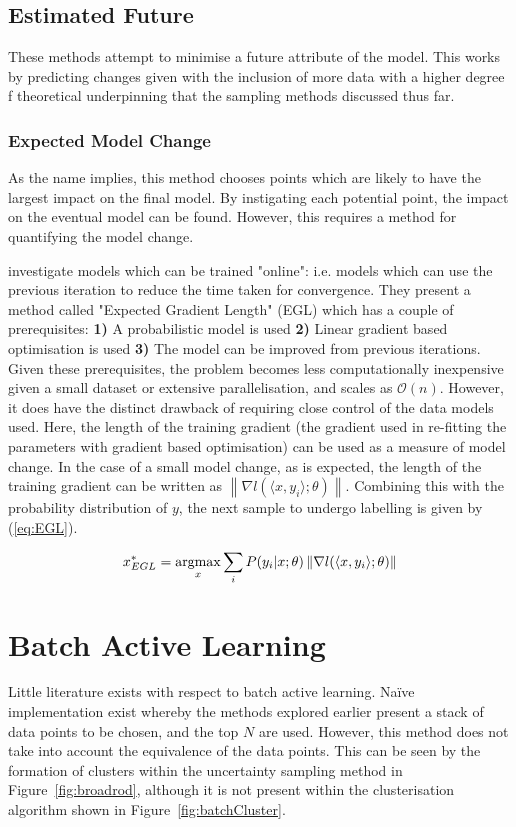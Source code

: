\subsection{Estimated Future}
These methods attempt to minimise a future attribute of the model. This works by predicting changes given with the inclusion of more data with a higher degree f theoretical underpinning that the sampling methods discussed thus far.

\subsubsection{Expected Model Change}
As the name implies, this method chooses points which are likely to have the largest impact on the final model. By instigating each potential point, the impact on the eventual model can be found. However, this requires a method for quantifying the model change.

\textcite{Set08,Set09} investigate models which can be trained "online": i.e. models which can use the previous iteration to reduce the time taken for convergence. They present a method called "Expected Gradient Length" (EGL) which has a couple of prerequisites: \textbf{1)} A probabilistic model is used \textbf{2)} Linear gradient based optimisation is used \textbf{3)} The model can be improved from previous iterations. Given these prerequisites, the problem becomes less computationally inexpensive given a small dataset or extensive parallelisation, and scales as $\mathcal{O}(n)$. However, it does have the distinct drawback of requiring close control of the data models used. Here, the length of the training gradient (the gradient used in re-fitting the parameters with gradient based optimisation) can be used as a measure of model change. In the case of a small model change, as is expected, the length of the training gradient can be written as ${\left\|\nabla{}l(\langle{}x, y_i\rangle{};\theta{})\right\|}$. Combining this with the probability distribution of $y$, the next sample to undergo labelling is given by (\ref{eq:EGL}).

\begin{equation}
    \label{eq:EGL}
    x_{EGL}^*=\operatorname*{argmax}_x{\sum_i{P(y_i|x;\theta{})\left\|\nabla{}l(\langle{}x, y_i\rangle{};\theta{})\right\|}}
\end{equation}


\section{Batch Active Learning}
Little literature exists with respect to batch active learning. Naïve implementation exist whereby the methods explored earlier present a stack of data points to be chosen, and the top $N$ are used. However, this method does not take into account the equivalence of the data points. This can be seen by the formation of clusters within the uncertainty sampling method in Figure~\ref{fig:broadrod}, although it is not present within the clusterisation algorithm shown in Figure~\ref{fig:batchCluster}.

